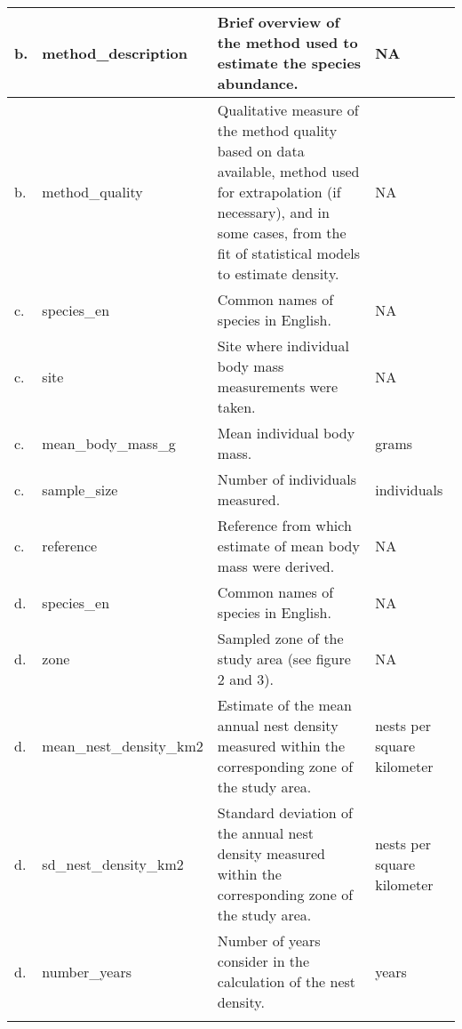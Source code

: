 \begin{longtable}{|p{}|p{}|p{}|p{}|}
   \hline
b. & method\_description & Brief overview of the method used to estimate the species abundance. & NA \\ 
   \hline
b. & method\_quality &  Qualitative measure of the method quality based on data available, method used for extrapolation (if necessary),
and in some cases, from the fit of statistical models to estimate density. & NA \\ 
   \hline
c. & species\_en & Common names of species in English. & NA \\ 
   \hline
c. & site & Site where individual body mass measurements were taken. & NA \\ 
   \hline
c. & mean\_body\_mass\_g & Mean individual body mass. & grams \\ 
   \hline
c. & sample\_size & Number of individuals measured. & individuals \\ 
   \hline
c. & reference & Reference from which estimate of mean body mass were derived. & NA \\ 
   \hline
d. & species\_en & Common names of species in English. & NA \\ 
   \hline
d. & zone & Sampled zone of the study area (see figure 2 and 3). & NA \\ 
   \hline
d. & mean\_nest\_density\_km2 & Estimate of the mean annual nest density measured within the corresponding zone
of the study area. & nests per square kilometer \\ 
   \hline
d. & sd\_nest\_density\_km2 & Standard deviation of the annual nest density measured within the corresponding
zone of the study area. & nests per square kilometer \\ 
   \hline
d. & number\_years & Number of years consider in the calculation of the nest density. & years \\ 
   \hline
\hline
\label{table:table_variables_definition}
\end{longtable}
\endgroup
